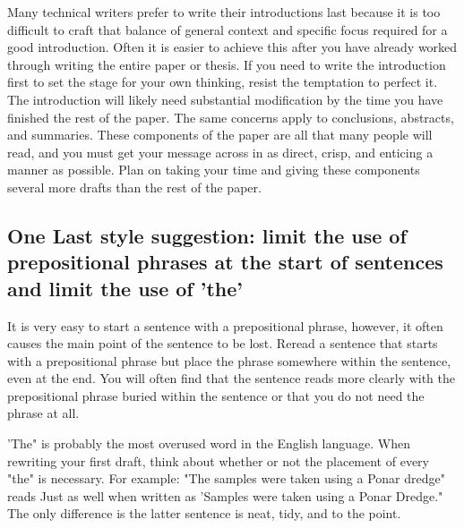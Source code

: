 \documentclass[11pt]{article}
\begin{document}
Many technical writers prefer to write their introductions last because it is too difficult to craft that balance of general context and specific focus required for a good introduction. Often it is easier to achieve this after you have already worked through writing the entire paper or thesis. If you need to write the introduction first to set the stage for your own thinking, resist the temptation to perfect it. The introduction will likely need substantial modification by the time you have finished the rest of the paper. The same concerns apply to conclusions, abstracts, and summaries. These components of the paper are all that many people will read, and you must get your message across in as direct, crisp, and enticing a manner as possible. Plan on taking your time and giving these components several more drafts than the rest of the paper.

\subsection{One Last style suggestion: limit the use of prepositional phrases at the start of sentences and limit the use of 'the'}

It is very easy to start a sentence with a prepositional phrase, however, it often causes the main point of the sentence to be lost. Reread a sentence that starts with a prepositional phrase but place the phrase somewhere within the sentence, even at the end. You will often find that the sentence reads more clearly with the prepositional phrase buried within the sentence or that you do not need the phrase at all.

'The" is probably the most overused word in the English language. When rewriting your first draft, think about whether or not the placement of every "the" is necessary. For example: "The samples were taken using a Ponar dredge" reads Just as well when written as 'Samples were taken using a Ponar Dredge." The only difference is the latter sentence is neat, tidy, and to the point.
\end{document}
